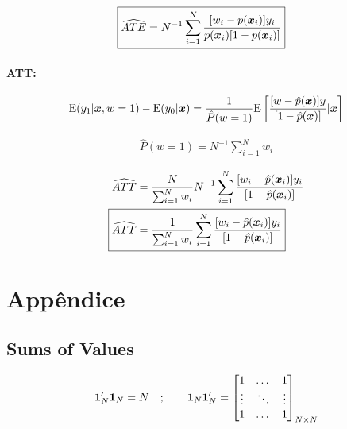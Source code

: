 \documentclass[11pt, oneside, a4paper, article]{article}
\numberwithin{equation}{section}
\begin{document}
\begin{description}
\begin{description}
\begin{align*}
\Aboxed{
\widehat{ATE} =
N^{-1} \sum_{i=1}^{N}
\frac{[ w_{i} - p(\mbs{x}_{i} ) ] y_{i} }{ p( \mbs{x}_{i} ) [1 - p( \mbs{x}_{i} ) ] }
}
\end{align*}

\paragraph{ATT:}

\begin{align*}
\text{E}( y_{1} | \boldsymbol{x}, w=1) - \text{E}(y_{0} | \boldsymbol{x}) =
\frac{1}{\hat{P}(w=1)}
\text{E}\left[ 
\frac{[w - \hat{p}(\boldsymbol{x})] y}{[ 1 - \hat{p}(\boldsymbol{x}) ]}
| \boldsymbol{x}
\right]
\end{align*}

\vspace{-1 em}
\begin{align*}
	\hat{P} (w = 1) = N^{-1} \sum_{i=1}^{N} w_{i}
\end{align*}

\vspace{-1.5 em}
\begin{align*}
\widehat{ATT} &=
\frac{N}{\sum_{i=1}^{N} w_{i} }
N^{-1} \sum_{i=1}^{N}
\frac{[ w_{i} - \hat{p}(\mbs{x}_{i} ) ] y_{i} }{[ 1 - \hat{p}( \mbs{x}_{i} ) ]}
\\
\Aboxed{
\widehat{ATT} &=
\frac{1}{\sum_{i=1}^{N} w_{i} }
\sum_{i=1}^{N}
\frac{[ w_{i} - \hat{p}(\mbs{x}_{i} ) ] y_{i} }{[1 - \hat{p}( \mbs{x}_{i} ) ]}
}
\end{align*}

\clearpage
\section*{Appêndice}

\subsection*{Sums of Values}
\noindent
\cite[p. 977, A.2.7]{greene-7ed}

\begin{align*}
\boldsymbol{1}_{N}' \boldsymbol{1}_{N} = N
\quad ; \qquad
\boldsymbol{1}_{N} \boldsymbol{1}_{N}' =
\begin{bmatrix}
	1 & \dots & 1	 \\
	\vdots & \ddots & \vdots \\
	1 & \dots & 1	
\end{bmatrix}_{N \times N}
\end{align*}


\end{description}
\end{description}
\end{document}
